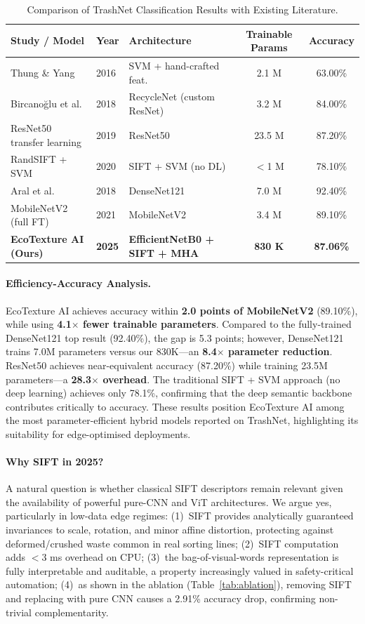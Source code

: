 \documentclass[12pt, a4paper]{article}
\begin{document}
\begin{table}[H]
\centering
\caption{Comparison of TrashNet Classification Results with Existing Literature.}
\label{tab:literature}
\begin{tabular}{lllcc}
\toprule
\textbf{Study / Model} & \textbf{Year} & \textbf{Architecture} & \textbf{Trainable Params} & \textbf{Accuracy} \\
\midrule
Thung \& Yang \citep{trashnet} & 2016 & SVM + hand-crafted feat. & 2.1 M & 63.00\% \\
Bircano\u{g}lu et al. & 2018 & RecycleNet (custom ResNet) & 3.2 M & 84.00\% \\
ResNet50 transfer learning & 2019 & ResNet50 & 23.5 M & 87.20\% \\
RandSIFT + SVM & 2020 & SIFT + SVM (no DL) & $<$1 M & 78.10\% \\
Aral et al. & 2018 & DenseNet121 & 7.0 M & 92.40\% \\
MobileNetV2 (full FT) & 2021 & MobileNetV2 & 3.4 M & 89.10\% \\
\midrule
\textbf{EcoTexture AI (Ours)} & \textbf{2025} & \textbf{EfficientNetB0 + SIFT + MHA} & \textbf{830 K} & \textbf{87.06\%} \\
\bottomrule
\end{tabular}
\end{table}

\paragraph{Efficiency-Accuracy Analysis.}
EcoTexture AI achieves accuracy within \textbf{2.0 points of MobileNetV2} (89.10\%), while using \textbf{4.1$\times$ fewer trainable parameters}. Compared to the fully-trained DenseNet121 top result (92.40\%), the gap is 5.3 points; however, DenseNet121 trains 7.0M parameters versus our 830K---an \textbf{8.4$\times$ parameter reduction}. ResNet50 achieves near-equivalent accuracy (87.20\%) while training 23.5M parameters---a \textbf{28.3$\times$ overhead}. The traditional SIFT + SVM approach (no deep learning) achieves only 78.1\%, confirming that the deep semantic backbone contributes critically to accuracy. These results position EcoTexture AI among the most parameter-efficient hybrid models reported on TrashNet, highlighting its suitability for edge-optimised deployments.

\paragraph{Why SIFT in 2025?}
A natural question is whether classical SIFT descriptors remain relevant given the availability of powerful pure-CNN and ViT architectures. We argue yes, particularly in low-data edge regimes: (1)~SIFT provides analytically guaranteed invariances to scale, rotation, and minor affine distortion, protecting against deformed/crushed waste common in real sorting lines; (2)~SIFT computation adds $<$3 ms overhead on CPU; (3)~the bag-of-visual-words representation is fully interpretable and auditable, a property increasingly valued in safety-critical automation; (4)~as shown in the ablation (Table~\ref{tab:ablation}), removing SIFT and replacing with pure CNN causes a 2.91\% accuracy drop, confirming non-trivial complementarity.
\end{document}
